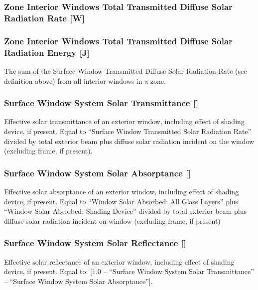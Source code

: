 \subsubsection{Zone Interior Windows Total Transmitted Diffuse Solar Radiation Rate {[}W{]}}\label{zone-interior-windows-total-transmitted-diffuse-solar-radiation-rate-w}

\subsubsection{Zone Interior Windows Total Transmitted Diffuse Solar Radiation Energy {[}J{]}}\label{zone-interior-windows-total-transmitted-diffuse-solar-radiation-energy-j}

The sum of the Surface Window Transmitted Diffuse Solar Radiation Rate (see definition above) from all interior windows in a zone.

\subsubsection{Surface Window System Solar Transmittance {[]}}\label{surface-window-system-solar-transmittance}

Effective solar transmittance of an exterior window, including effect of shading device, if present. Equal to ``Surface Window Transmitted Solar Radiation Rate'' divided by total exterior beam plus diffuse solar radiation incident on the window (excluding frame, if present).

\subsubsection{Surface Window System Solar Absorptance {[]}}\label{surface-window-system-solar-absorptance}

Effective solar absorptance of an exterior window, including effect of shading device, if present. Equal to ``Window Solar Absorbed: All Glass Layers'' plus ``Window Solar Absorbed: Shading Device'' divided by total exterior beam plus diffuse solar radiation incident on window (excluding frame, if present)

\subsubsection{Surface Window System Solar Reflectance {[]}}\label{surface-window-system-solar-reflectance}

Effective solar reflectance of an exterior window, including effect of shading device, if present. Equal to: {[}1.0 -- ``Surface Window System Solar Transmittance'' -- ``Surface Window System Solar Absorptance''{]}.

